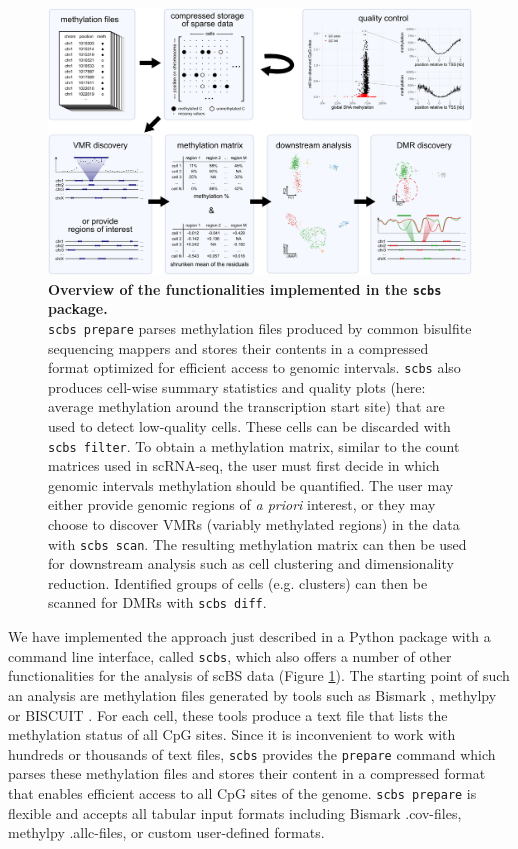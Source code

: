 \documentclass[twocolumn,10pt]{article}
\begin{document}
\begin{figure}[t]
    \begin{center}
        \includegraphics[width=.8\textwidth]{figures/Fig_workflow.png}
    \end{center}
    \caption{\small \textbf{Overview of the functionalities implemented in the \texttt{scbs} package.}\\
        \texttt{scbs prepare} parses methylation files produced by common bisulfite sequencing mappers and stores their contents in a compressed format optimized for efficient access to genomic intervals.
        \texttt{scbs} also produces cell-wise summary statistics and quality plots (here: average methylation around the transcription start site) that are used to detect low-quality cells.
        These cells can be discarded with \texttt{scbs filter}.
        To obtain a methylation matrix, similar to the count matrices used in scRNA-seq, the user must first decide in which genomic intervals methylation should be quantified.
        The user may either provide genomic regions of \emph{a priori} interest, or they may choose to discover VMRs (variably methylated regions) in the data with \texttt{scbs scan}.
        The resulting methylation matrix can then be used for downstream analysis such as cell clustering and dimensionality reduction.
        Identified groups of cells (e.g. clusters) can then be scanned for DMRs with \texttt{scbs diff}.
    }
    \label{fig:workflow}
\end{figure}

We have implemented the approach just described in a Python package with a command line interface, called \texttt{scbs}, which also offers a number of other functionalities for the analysis of scBS data (Figure \ref{fig:workflow}).
The starting point of such an analysis are methylation files generated by tools such as Bismark \citep{bismark}, methylpy \citep{methylpy} or BISCUIT \citep{biscuit}.
For each cell, these tools produce a text file that lists the methylation status of all CpG sites.
Since it is inconvenient to work with hundreds or thousands of text files, \texttt{scbs} provides the \texttt{prepare} command which parses these methylation files and stores their content in a compressed format that enables efficient access to all CpG sites of the genome.
\texttt{scbs prepare} is flexible and accepts all tabular input formats including Bismark .cov-files, methylpy .allc-files, or custom user-defined formats.
\end{document}
